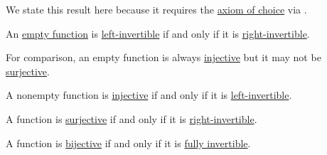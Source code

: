 \begin{proposition}\label{thm:function_invertibility_categorical}
  We state this result here because it requires the \hyperref[def:zfc/choice]{axiom of choice} via .

  \begin{thmenum}
     An \hyperref[def:multi_valued_function/empty]{empty function} is \hyperref[def:function_invertibility_categorical/left]{left-invertible} if and only if it is \hyperref[def:function_invertibility_categorical/left]{right-invertible}.

    For comparison, an empty function is always \hyperref[def:function_invertibility/injective]{injective} but it may not be \hyperref[def:function_invertibility/surjective]{surjective}.

     A nonempty function is \hyperref[def:function_invertibility/injective]{injective} if and only if it is \hyperref[def:function_invertibility_categorical/left]{left-invertible}.

     A function is \hyperref[def:function_invertibility/surjective]{surjective} if and only if it is \hyperref[def:function_invertibility_categorical/right]{right-invertible}.

     A function is \hyperref[def:function_invertibility/bijective]{bijective} if and only if it is \hyperref[def:function_invertibility_categorical/two_sided]{fully invertible}.
  \end{thmenum}
\end{proposition}
